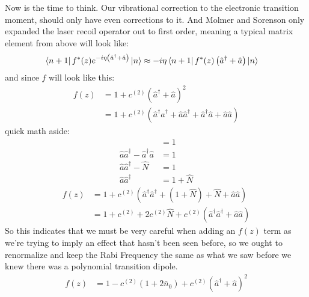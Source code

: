 Now is the time to think.  Our vibrational correction to the electronic transition moment, should only have even corrections to it.  And Molmer and Sorenson only expanded the laser recoil operator out to first order, meaning a typical matrix element from above will look like:
\begin{align*}
	\bra{n + 1} f^*(z) e^{-i \eta\left( \hat{a}^{\dagger} + \hat{a} \right) }  \ket{n} &\approx -i \eta \bra{n + 1} f^*(z) \left( \hat{a}^{\dagger} + \hat{a} \right)  \ket{n}
\end{align*}
and since $f$ will look like this:
\begin{align*}
	 f(z) &= 1 + c^{(2)}\left( \hat{a}^{\dagger} + \hat{a}  \right)^2 \\
	 &= 1 + c^{(2)}\left( \hat{a}^{\dagger}\hat{a}^{\dagger} + \hat{a}\hat{a}^{\dagger} + \hat{a}^{\dagger}\hat{a} + \hat{a}\hat{a}  \right)
\end{align*}
quick math aside:
\begin{align*}
	 [\hat{a}, \hat{a}^{\dagger}] &= 1\\
	 \hat{a} \hat{a}^{\dagger} - \hat{a}^{\dagger}\hat{a} &= 1\\
	 \hat{a} \hat{a}^{\dagger} - \hat{N} &= 1\\
	 \hat{a} \hat{a}^{\dagger}  &= 1 + \hat{N}
\end{align*}
\begin{align*}
	 f(z) &= 1 + c^{(2)}\left( \hat{a}^{\dagger}\hat{a}^{\dagger} + \left(  1 + \hat{N} \right) + \hat{N} + \hat{a}\hat{a}  \right) \\
	 &= 1 + c^{(2)}  + 2 c^{(2)} \hat{N} +  c^{(2)}\left( \hat{a}^{\dagger}\hat{a}^{\dagger} + \hat{a}\hat{a}  \right)
\end{align*}
So this indicates that we must be very careful when adding an $f(z)$ term as we're trying to imply an effect that hasn't been seen before, so we ought to renormalize and keep the Rabi Frequency the same as what we saw before we knew there was a polynomial transition dipole.
\begin{align*}
	 f(z) &= 1 - c^{(2)} (1 + 2 \bar{n}_0 ) + c^{(2)}\left( \hat{a}^{\dagger} + \hat{a}  \right)^2
\end{align*}

